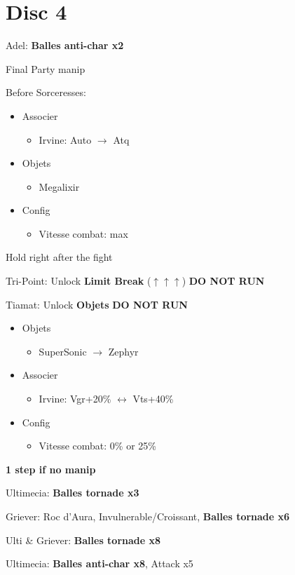 \chapter{Disc 4}

Adel: \textbf{Balles anti-char x2}

Final Party manip

Before Sorceresses:
\begin{menu}
	\begin{itemize}
		\item Associer
			\begin{itemize}
				\item Irvine: Auto $\rightarrow$ Atq
			\end{itemize}
		\item Objets
			\begin{itemize}
				\item Megalixir
			\end{itemize}
		\item Config
			\begin{itemize}
				\item Vitesse combat: max
			\end{itemize}
	\end{itemize}
\end{menu}

Hold right after the fight

Tri-Point: Unlock \textbf{Limit Break} ($\uparrow\uparrow\uparrow$) \textbf{DO NOT RUN}

Tiamat: Unlock \textbf{Objets} \textbf{DO NOT RUN}

\begin{menu}
	\begin{itemize}
		\item Objets
			\begin{itemize}
				\item SuperSonic $\rightarrow$ Zephyr
			\end{itemize}
		\item Associer
			\begin{itemize}
				\item Irvine: Vgr+20\% $\leftrightarrow$ Vts+40\%
			\end{itemize}
		\item Config
			\begin{itemize}
				\item Vitesse combat: 0\% or 25\%
			\end{itemize}
	\end{itemize}
\end{menu}

\textbf{1 step if no manip}

Ultimecia: \textbf{Balles tornade x3}

Griever: Roc d'Aura, Invulnerable/Croissant, \textbf{Balles tornade x6}

Ulti \& Griever: \textbf{Balles tornade x8}

Ultimecia: \textbf{Balles anti-char x8}, Attack x5
